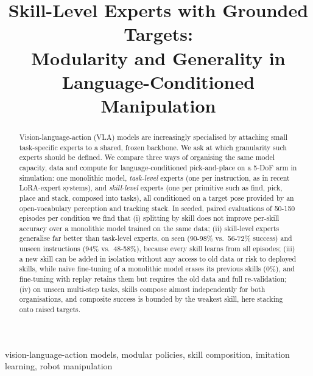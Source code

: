 \documentclass[conference]{IEEEtran}
\title{Skill-Level Experts with Grounded Targets:\\
Modularity and Generality in\\Language-Conditioned Manipulation}
\author{\IEEEauthorblockN{Prateek Pawar}
\IEEEauthorblockA{Independent researcher\\
prateekspawar@gmail.com}}
\begin{document}
\maketitle

\begin{abstract}
Vision-language-action (VLA) models are increasingly specialised by attaching small task-specific experts to a
shared, frozen backbone. We ask at which granularity such experts should be defined. We compare three ways of
organising the same model capacity, data and compute for language-conditioned pick-and-place on a 5-DoF arm in
simulation: one monolithic model, \emph{task-level} experts (one per instruction, as in recent LoRA-expert
systems), and \emph{skill-level} experts (one per primitive such as find, pick, place and stack, composed into
tasks), all conditioned on a target pose provided by an open-vocabulary perception and tracking stack. In seeded,
paired evaluations of 50-150 episodes per condition we find that (i) splitting by skill does not improve per-skill
accuracy over a monolithic model trained on the same data; (ii) skill-level experts generalise far better than
task-level experts, on seen (90-98\% vs.\ 56-72\% success) and unseen instructions (94\% vs.\ 48-58\%), because
every skill learns from all episodes; (iii) a new skill can be added in isolation without any access to old data
or risk to deployed skills, while naive fine-tuning of a monolithic model erases its previous skills (0\%), and
fine-tuning with replay retains them but requires the old data and full re-validation; (iv) on unseen multi-step
tasks, skills compose almost independently for both organisations, and composite success is bounded by the
weakest skill, here stacking onto raised targets.
\end{abstract}

\begin{IEEEkeywords}
vision-language-action models, modular policies, skill composition, imitation learning, robot manipulation
\end{IEEEkeywords}

\end{document}
